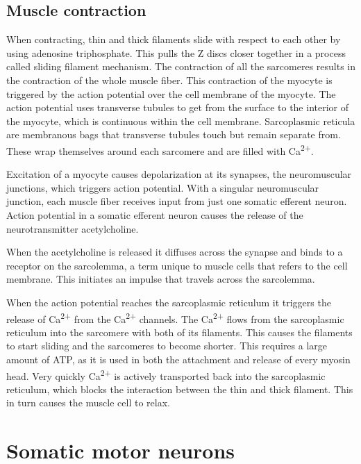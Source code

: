 \documentclass[]{book}
\begin{document}
\hypertarget{muscle-contraction}{%
\subsection{Muscle contraction}\label{muscle-contraction}}

When contracting, thin and thick filaments slide with respect to each other by using adenosine triphosphate. This pulls the Z discs closer together in a process called sliding filament mechanism. The contraction of all the sarcomeres results in the contraction of the whole muscle fiber. This contraction of the myocyte is triggered by the action potential over the cell membrane of the myocyte. The action potential uses transverse tubules to get from the surface to the interior of the myocyte, which is continuous within the cell membrane. Sarcoplasmic reticula are membranous bags that transverse tubules touch but remain separate from. These wrap themselves around each sarcomere and are filled with Ca\textsuperscript{2+}.

Excitation of a myocyte causes depolarization at its synapses, the neuromuscular junctions, which triggers action potential. With a singular neuromuscular junction, each muscle fiber receives input from just one somatic efferent neuron. Action potential in a somatic efferent neuron causes the release of the neurotransmitter acetylcholine.

When the acetylcholine is released it diffuses across the synapse and binds to a receptor on the sarcolemma, a term unique to muscle cells that refers to the cell membrane. This initiates an impulse that travels across the sarcolemma.

When the action potential reaches the sarcoplasmic reticulum it triggers the release of Ca\textsuperscript{2+} from the Ca\textsuperscript{2+} channels. The Ca\textsuperscript{2+} flows from the sarcoplasmic reticulum into the sarcomere with both of its filaments. This causes the filaments to start sliding and the sarcomeres to become shorter. This requires a large amount of ATP, as it is used in both the attachment and release of every myosin head. Very quickly Ca\textsuperscript{2+} is actively transported back into the sarcoplasmic reticulum, which blocks the interaction between the thin and thick filament. This in turn causes the muscle cell to relax.

\hypertarget{somatic-motor-neurons}{%
\section{Somatic motor neurons}\label{somatic-motor-neurons}}
\end{document}

